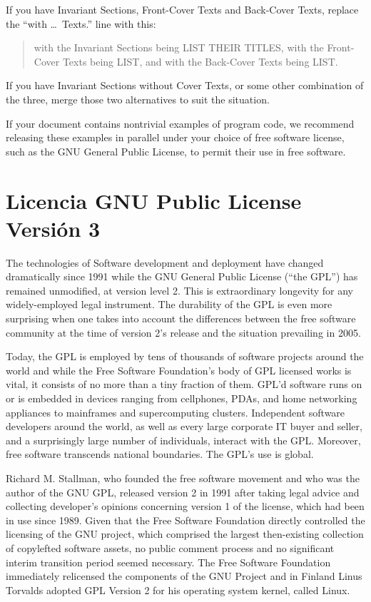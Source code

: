 \documentclass[a4paper,spanish,12pt]{book}
\begin{document}
If you have Invariant Sections, Front-Cover Texts and Back-Cover Texts,
replace the ``with \dots\ Texts.'' line with this:

\bigskip
\begin{quote}
    with the Invariant Sections being LIST THEIR TITLES, with the
    Front-Cover Texts being LIST, and with the Back-Cover Texts being LIST.
\end{quote}
\bigskip
    
If you have Invariant Sections without Cover Texts, or some other
combination of the three, merge those two alternatives to suit the
situation.

If your document contains nontrivial examples of program code, we
recommend releasing these examples in parallel under your choice of
free software license, such as the GNU General Public License,
to permit their use in free software.

\section{Licencia GNU Public License Versión 3}
The technologies of
Software development and deployment have changed dramatically since
1991 while the GNU General Public License (``the GPL'') has remained
unmodified, at version level 2.  This is extraordinary longevity for
any widely-employed legal instrument.  The durability of the GPL is
even more surprising when one takes into account the differences
between the free software community at the time of version 2's release
and the situation prevailing in 2005.

Today, the GPL is employed by tens of thousands of software projects
around the world and while the Free Software Foundation's body of GPL
licensed works is vital, it consists of no more than a tiny fraction
of them.  GPL'd software runs on or is embedded in devices ranging
from cellphones, PDAs, and home networking appliances to mainframes
and supercomputing clusters.  Independent software developers around
the world, as well as every large corporate IT buyer and seller, and a
surprisingly large number of individuals, interact with the GPL\@.
Moreover, free software transcends national boundaries.  The GPL's use
is global.

Richard M. Stallman, who founded the free software movement and who
was the author of the GNU GPL, released version 2 in 1991 after taking
legal advice and collecting developer's opinions concerning version 1
of the license, which had been in use since 1989.  Given that the Free
Software Foundation directly controlled the licensing of the GNU
project, which comprised the largest then-existing collection of
copylefted software assets, no public comment process and no
significant interim transition period seemed necessary.  The Free
Software Foundation immediately relicensed the components of the GNU
Project and in Finland Linus Torvalds adopted GPL Version 2 for his
operating system kernel, called Linux.
\end{document}
